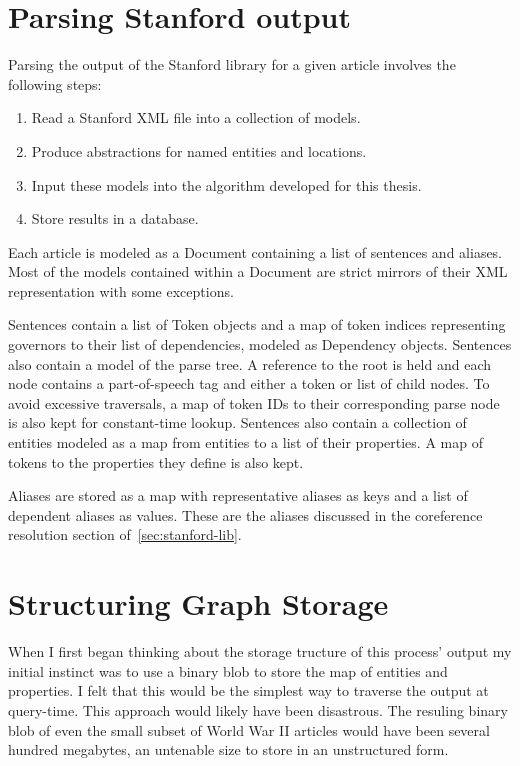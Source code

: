 \section{Parsing Stanford output}

Parsing the output of the Stanford library for a given article involves the following steps:

\begin{enumerate}
\item Read a Stanford XML file into a collection of models.
\item Produce abstractions for named entities and locations.
\item Input these models into the algorithm developed for this thesis.
\item Store results in a database.
\end{enumerate}

Each article is modeled as a Document containing a list of sentences and aliases.  Most of the models contained within a Document are strict mirrors of their XML representation with some exceptions.

Sentences contain a list of Token objects and a map of token indices representing governors to their list of dependencies, modeled as Dependency objects.  Sentences also contain a model of the parse tree.  A reference to the root is held and each node contains a part-of-speech tag and either a token or list of child nodes.  To avoid excessive traversals, a map of token IDs to their corresponding parse node is also kept for constant-time lookup.  Sentences also contain a collection of entities modeled as a map from entities to a list of their properties.  A map of tokens to the properties they define is also kept.



Aliases are stored as a map with representative aliases as keys and a list of dependent aliases as values.  These are the aliases discussed in the coreference resolution section of~\ref{sec:stanford-lib}.  



\section{Structuring Graph Storage}

When I first began thinking about the storage tructure of this process' output my initial instinct was to use a binary blob to store the map of entities and properties.  I felt that this would be the simplest way to traverse the output at query-time.  This approach would likely have been disastrous.  The resuling binary blob of even the small subset of World War II articles would have been several hundred megabytes, an untenable size to store in an unstructured form.

